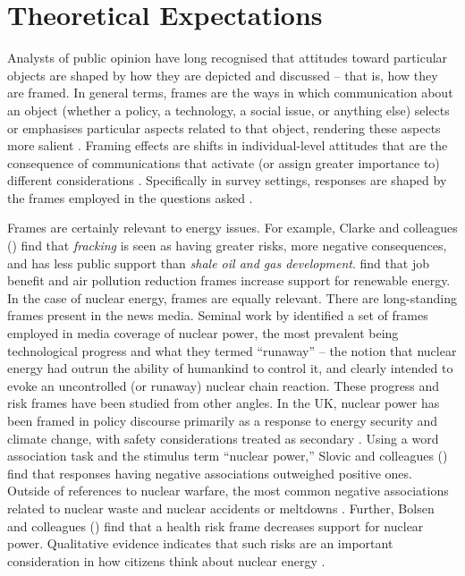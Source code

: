 \documentclass[a4paper, 11pt]{article}
\begin{document}
\section{Theoretical Expectations}

Analysts of public opinion have long recognised that attitudes toward particular objects are shaped by how they are depicted and discussed -- that is, how they are framed. In general terms, frames are the ways in which communication about an object (whether a policy, a technology, a social issue, or anything else) selects or emphasises particular aspects related to that object, rendering these aspects more salient \citep{entman1993}. Framing effects are shifts in individual-level attitudes that are the consequence of communications that activate (or assign greater importance to) different considerations \citep{chong2007,druckman2001,nelson1997}. Specifically in survey settings, responses are shaped by the frames employed in the questions asked \citep{zaller1992}.

Frames are certainly relevant to energy issues. For example, Clarke and colleagues (\citeyear{clarke2015}) find that \emph{fracking} is seen as having greater risks, more negative consequences, and has less public support than \emph{shale oil and gas development}. \citet{stokes2017} find that job benefit and air pollution reduction frames increase support for renewable energy. In the case of nuclear energy, frames are equally relevant. There are long-standing frames present in the news media. Seminal work by \citet{gamson1989} identified a set of frames employed in media coverage of nuclear power, the most prevalent being technological progress and what they termed ``runaway'' -- the notion that nuclear energy had outrun the ability of humankind to control it, and clearly intended to evoke an uncontrolled (or runaway) nuclear chain reaction. These progress and risk frames have been studied from other angles. In the UK, nuclear power has been framed in policy discourse primarily as a response to energy security and climate change, with safety considerations treated as secondary \citep{peoples2014}. Using a word association task and the stimulus term ``nuclear power,'' Slovic and colleagues (\citeyear{slovic2000}) find that responses having negative associations outweighed positive ones. Outside of references to nuclear warfare, the most common negative associations related to nuclear waste and nuclear accidents or meltdowns \citep{slovic2000}. Further, Bolsen and colleagues (\citeyear{bolsen2014}) find that a health risk frame decreases support for nuclear power. Qualitative evidence indicates that such risks are an important consideration in how citizens think about nuclear energy \citep{bickerstaff2008}.
\end{document}

